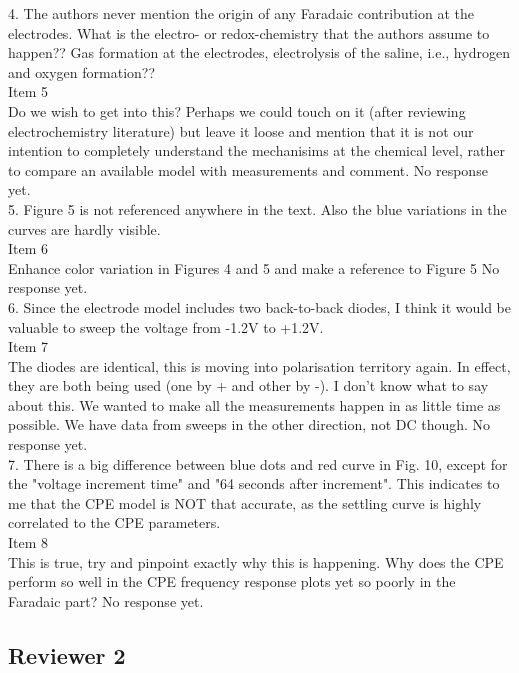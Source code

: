\documentclass[journal, a4paper]{IEEEtran}
\begin{document}
{4. The authors never mention the origin of any Faradaic contribution at the electrodes. What is the electro- or redox-chemistry that the authors assume to happen?? Gas formation at the electrodes, electrolysis of the saline, i.e., hydrogen and oxygen formation??\\
{\color{OliveGreen}
    Item 5\\
    {\color{Red} Do we wish to get into this? Perhaps we could touch on it (after reviewing electrochemistry literature) but leave it loose and mention that it is not our intention to completely understand the mechanisims at the chemical level, rather to compare an available model with measurements and comment.}
    No response yet.
}\\

5. Figure 5 is not referenced anywhere in the text. Also the blue variations in the curves are hardly visible.\\
{\color{OliveGreen} 
    Item 6\\
    {\color{Red} Enhance color variation in Figures 4 and 5 and make a reference to Figure 5}
    No response yet.
}\\

6. Since the electrode model includes two back-to-back diodes, I think it would be valuable to sweep the voltage from -1.2V to +1.2V.\\
{\color{OliveGreen}
    Item 7\\
    {\color{Red} The diodes are identical, this is moving into polarisation territory again. In effect, they are both being used (one by + and other by -). I don't know what to say about this. We wanted to make all the measurements happen in as little time as possible. We have data from sweeps in the other direction, not DC though.}
    No response yet.
}\\

7. There is a big difference between blue dots and red curve in Fig. 10, except for the "voltage increment time" and "64 seconds after increment".  This indicates to me that the CPE model is NOT that accurate, as the settling curve is highly correlated to the CPE parameters.\\
{\color{OliveGreen}
    Item 8\\
    {\color{Red} This is true, try and pinpoint exactly why this is happening. Why does the CPE perform so well in the CPE frequency response plots yet so poorly in the Faradaic part?}
    No response yet.
}\\
}

\subsection*{Reviewer 2}
\end{document}
